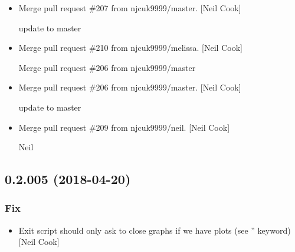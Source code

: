 \documentclass[a4paper,10pt,english]{report}
\begin{document}
\begin{itemize}
\item {} 
Merge pull request \#207 from njcuk9999/master. {[}Neil Cook{]}

update to master

\item {} 
Merge pull request \#210 from njcuk9999/melissa. {[}Neil Cook{]}

Merge pull request \#206 from njcuk9999/master

\item {} 
Merge pull request \#206 from njcuk9999/master. {[}Neil Cook{]}

update to master

\item {} 
Merge pull request \#209 from njcuk9999/neil. {[}Neil Cook{]}

Neil

\end{itemize}


\subsection{0.2.005 (2018-04-20)}
\label{\detokenize{misc/changelog:id456}}

\subsubsection{Fix}
\label{\detokenize{misc/changelog:fix}}\begin{itemize}
\item {} 
Exit script should only ask to close graphs if we have plots (see
” keyword) {[}Neil Cook{]}

\end{itemize}
\end{document}
